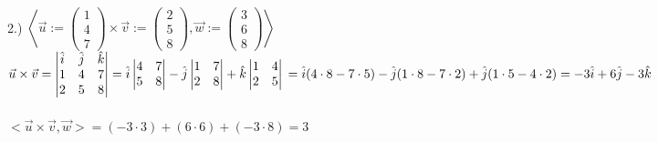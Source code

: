 \documentclass{article}
\begin{document}
\begin{enumerate}[c.]
	\\
	2.)
	$\left<\vec{u}:=\left(\!
	\begin{array}{c}
		1 \\
		4 \\
		7 
	\end{array}
	\!\right)\times\vec{v}:=\left(\!
	\begin{array}{c}
		2 \\
		5 \\
		8 
	\end{array}
	\!\right),\vec{w}:=\left(\!
	\begin{array}{c}
		3 \\
		6 \\
		8 
	\end{array}
	\!\right)\right>$\\ 
	$\vec{u}\times\vec{v}=\begin{vmatrix}
	\hat{i}&\hat{j}&\hat{k}\\
	1&4&7\\
	2&5&8\\
	\end{vmatrix}=\hat{i}\begin{vmatrix}
	4&7\\
	5&8\\
	\end{vmatrix}-\hat{j}\begin{vmatrix}
	1&7\\
	2&8\\
	\end{vmatrix}+\hat{k}\begin{vmatrix}
	1&4\\
	2&5\\
	\end{vmatrix}\\ = \hat{i}(4 \cdot 8-7 \cdot5)-\hat{j}(1\cdot8-7\cdot2)+\hat{j}(1\cdot5-4\cdot2)\\=-3\hat{i}+6\hat{j}-3\hat{k}$\\
	\\
	$<\vec{u}\times\vec{v},\vec{w}>=(-3\cdot3)+(6\cdot6)+(-3\cdot8)=3 $\\
\end{enumerate}
\end{document}
